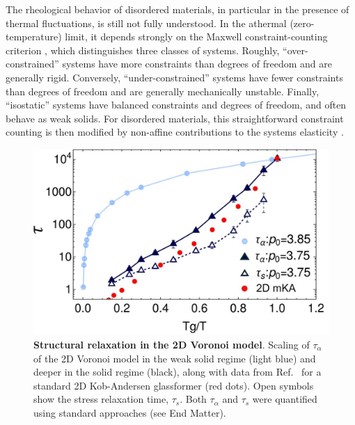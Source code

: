 \documentclass[aps,reprint,superscriptaddress,nofootinbib, notitlepage,prl]{revtex4-2}
\begin{document}
The rheological behavior of disordered materials, in particular in the presence of thermal fluctuations, is still not fully understood.
In the athermal (zero-temperature) limit, it depends strongly on the Maxwell constraint-counting criterion \cite{Maxwell1864,Calladine1978,lubensky2015phonons}, which distinguishes three classes of systems.
Roughly, ``over-constrained'' systems have more constraints than degrees of freedom and are generally rigid.
Conversely, ``under-constrained'' systems have fewer constraints than degrees of freedom and are generally mechanically unstable.
Finally, ``isostatic'' systems have balanced constraints and degrees of freedom, and often behave as weak solids. For disordered materials, this straightforward constraint counting is then modified by non-affine contributions to the systems elasticity \cite{lemaitre2006sum,zaccone2011approximate}.


\begin{figure}[b]
	\centering
	\includegraphics[width=1\linewidth]{tauAlphaPlot.jpg}
	\caption{\textbf{Structural relaxation in the 2D Voronoi model}.
    Scaling of $\tau_\alpha$ of the 2D Voronoi model in the weak solid regime (light blue) and deeper in the solid regime (black), along with data from Ref.~\cite{li2019long} for a standard 2D Kob-Andersen glassformer (red dots). Open symbols show the stress relaxation time, $\tau_s$. Both $\tau_\alpha$ and $\tau_s$ were quantified using standard approaches (see End Matter).
	}
	\label{fig:tauAlphaFig}
\end{figure}
\end{document}
